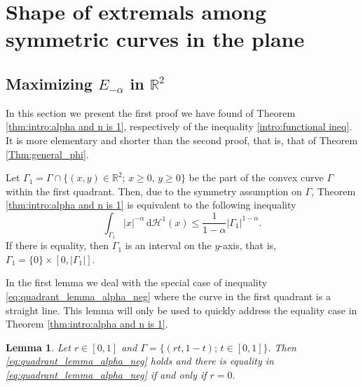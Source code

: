 \documentclass[10pt,leqno]{amsart}
\newcommand{\R}[0]{\mathbb{R}}
\newcommand{\dHo}{\, \mathrm{d} \mathcal{H}^{1}}
\numberwithin{Theorem}{section}
\newtheorem{Lemma}[Theorem]{Lemma}
\theoremstyle{definition}
\theoremstyle{remark}
\numberwithin{equation}{section}
\numberwithin{equation}{section}
\begin{document}
\section{Shape of extremals among symmetric curves in the plane}

\subsection{Maximizing $E_{-\alpha}$ in  $\R^2$}
\label{section:singular}

In this section we present the first proof we have found of Theorem \ref{thm:intro:alpha and n is 1}, respectively of the inequality \eqref{intro:functional ineq}. It is more elementary and shorter than the second proof, that is, that of Theorem \ref{Thm:general_phi}. 


Let $\Gamma_1=\Gamma \cap \{(x,y)\in\R^2;\, x\geq 0,\, y\geq 0\}$ be the part of  the convex curve $\Gamma$ within the first quadrant. Then, due to the symmetry assumption on $\Gamma$, Theorem \ref{thm:intro:alpha and n is 1} is equivalent to the following inequality
\begin{equation}\label{eq:quadrant_lemma_alpha_neg}
  \int_{\Gamma_1} |x|^{-\alpha} \dHo(x) \leq  \frac{1}{1-\alpha}|\Gamma_1|^{1-\alpha}.
  \end{equation}
  If there is equality, then $\Gamma_1$ is an interval on the $y$-axis, that is, $\Gamma_1=\{0\} \times [0,|\Gamma_1|].$




In the first lemma we deal with the special case of inequality \eqref{eq:quadrant_lemma_alpha_neg} where the curve in the first quadrant is a straight line. This lemma will only be used to quickly address the equality case in Theorem \ref{thm:intro:alpha and n is 1}.




\begin{Lemma}\label{gy:lemma:quadrant straight line}
Let $r\in [0,1]$ and $\Gamma=\{(rt,1-t);\, t\in [0,1]\}.$ Then \eqref{eq:quadrant_lemma_alpha_neg} holds and there is equality in \eqref{eq:quadrant_lemma_alpha_neg} if and only if $r=0.$
\end{Lemma}
\end{document}
